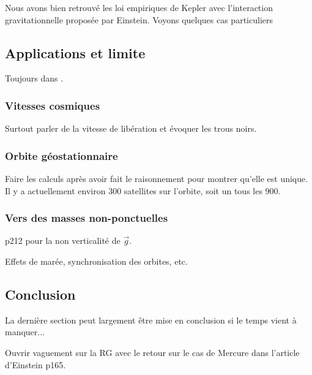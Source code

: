 \begin{transition}
Nous avons bien retrouvé les loi empiriques de Kepler avec l'interaction gravitationnelle proposée par Einstein.
Voyons quelques cas particuliers
\end{transition}

\subsection{Applications et limite}

Toujours dans \cite{Michel2017}.

\subsubsection{Vitesses cosmiques}

Surtout parler de la vitesse de libération et évoquer les trous noirs.

\subsubsection{Orbite géostationnaire}

Faire les calculs après avoir fait le raisonnement pour montrer qu'elle est unique.
Il y a actuellement environ 300 satellites sur l'orbite, soit un tous les \unit{900}{\kilo\meter}.

\subsubsection{Vers des masses non-ponctuelles}

\cite{Sanz2016} p212 pour la non verticalité de $\overrightarrow{g}$.

Effets de marée, synchronisation des orbites, etc.

\subsection*{Conclusion}

La dernière section peut largement être mise en conclusion si le temps vient à manquer...

Ouvrir vaguement sur la RG avec le retour sur le cas de Mercure dans l'article d'Einstein \cite{Faroux1996} p165.

\newpage